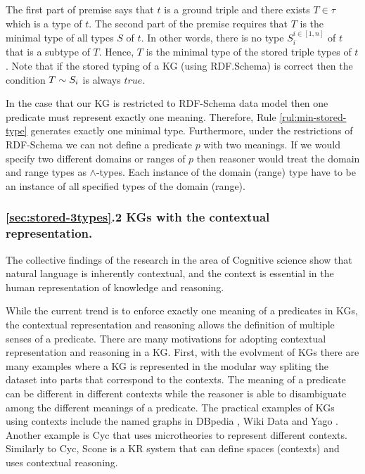 \documentclass[runningheads]{llncs}
\begin{document}
The first part of premise says that $t$ is a ground triple and there
exists $T\in\tau$ which is a type of $t$. The second part of the
premise requires that $T$ is the minimal type of all types $S$ of
$t$. In other words, there is no type $S_i^{i\in[1,n]}$ of $t$ that is
a subtype of $T$. Hence, $T$ is the minimal type of the stored triple
types of $t$. Note that if the stored typing of a KG (using
RDF.Schema) is correct then the condition $T\sim\/S_i$ is always
$true$.

In the case that our KG is restricted to RDF-Schema data model then
one predicate must represent exactly one meaning. Therefore, Rule
\ref{rul:min-stored-type} generates exactly one minimal
type. Furthermore, under the restrictions of RDF-Schema we can not
define a predicate $p$ with two meanings. If we would specify two
different domains or ranges of $p$ then reasoner would treat the
domain and range types as $\land$-types. Each instance of the domain
(range) type have to be an instance of all specified types of the
domain (range).

\subsubsection{\ref{sec:stored-3types}.2 KGs with the contextual representation.}

The collective findings of the research in the area of Cognitive
science \cite{Hollister2017} show that natural language is inherently
contextual, and the context is essential in the human representation
of knowledge and reasoning. 

While the current trend is to enforce exactly one meaning of a
predicates in KGs, the contextual representation and reasoning allows
the definition of multiple senses of a predicate. There are many
motivations for adopting contextual representation and reasoning in a
KG. First, with the evolvment of KGs there are many examples where a
KG is represented in the modular way spliting the dataset into parts
that correspond to the contexts. The meaning of a predicate can be
different in different contexts while the reasoner is able to
disambiguate among the different meanings of a predicate.
The practical examples of KGs using contexts include the named graphs
in DBpedia \cite{Auer2007}, Wiki Data \cite{vrandecic2014} and Yago
\cite{Hoffart2013}. Another example is Cyc \cite{cyc} that uses
microtheories to represent different contexts. Similarly to Cyc, Scone
\cite{Fahlman2011} is a KR system that can define spaces (contexts)
and uses contextual reasoning.
\end{document}
